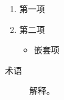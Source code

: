\documentclass{article}
\begin{document}
\begin{enumerate}
  \item 第一项
  \item 第二项
  \begin{itemize}
    \item 嵌套项
  \end{itemize}
\end{enumerate}
\begin{description}
  \item[术语] 解释。
\end{description}
\end{document}
